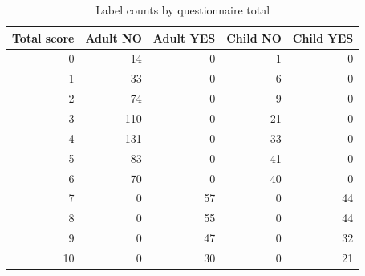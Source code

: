 \begin{table}
\caption{Label counts by questionnaire total}
\label{tab:table2_label_by_score}
\begin{tabular}{rrrrr}
\toprule
Total score & Adult NO & Adult YES & Child NO & Child YES \\
\midrule
0 & 14 & 0 & 1 & 0 \\
1 & 33 & 0 & 6 & 0 \\
2 & 74 & 0 & 9 & 0 \\
3 & 110 & 0 & 21 & 0 \\
4 & 131 & 0 & 33 & 0 \\
5 & 83 & 0 & 41 & 0 \\
6 & 70 & 0 & 40 & 0 \\
7 & 0 & 57 & 0 & 44 \\
8 & 0 & 55 & 0 & 44 \\
9 & 0 & 47 & 0 & 32 \\
10 & 0 & 30 & 0 & 21 \\
\bottomrule
\end{tabular}
\end{table}
